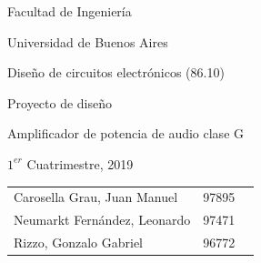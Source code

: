\begin{center}
	\Huge{Facultad de Ingeniería}\\
    		\vspace{3mm}

	\Huge{Universidad de Buenos Aires}
    
    		\vspace{3mm}

    
    \huge{Diseño de circuitos electrónicos (86.10)}
	
		\vspace{6mm}

\Large{Proyecto de diseño}

\vspace{6mm}

\Large{Amplificador de potencia de audio clase G}
\vspace{6mm}

\Large $1^{er}$ Cuatrimestre, 2019 \\
\vspace{6mm}
\vspace*{0.3 in}
\begin{tabular}{l c r}
\hline
\hline
\large{Carosella Grau, Juan Manuel} & \hspace{10mm}97895 & \hspace{10mm}{juancarosella96@gmail.com} \\
\large{Neumarkt Fernández, Leonardo} & \hspace{10mm}97471 & \hspace{10mm}{leoneu928@gmail.com} \\
\large{Rizzo, Gonzalo Gabriel} & \hspace{10mm}96772 & \hspace{10mm}{gonzalorizzo95@gmail.com}\\
\hline
\hline
\end{tabular}


\end{center}